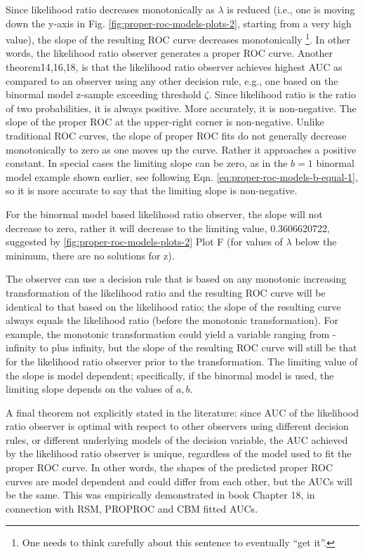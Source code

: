 \documentclass[
]{book}
\begin{document}
Since likelihood ratio decreases monotonically as \(\lambda\) is reduced (i.e., one is moving down the y-axis in Fig. \ref{fig:proper-roc-models-plots-2}, starting from a very high value), the slope of the resulting ROC curve decreases monotonically \footnote{One needs to think carefully about this sentence to eventually ``get it''.}. In other words, the likelihood ratio observer generates a proper ROC curve. Another theorem14,16,18, is that the likelihood ratio observer achieves highest AUC as compared to an observer using any other decision rule, e.g., one based on the binormal model z-sample exceeding threshold \(\zeta\). Since likelihood ratio is the ratio of two probabilities, it is always positive. More accurately, it is non-negative. The slope of the proper ROC at the upper-right corner is non-negative. Unlike traditional ROC curves, the slope of proper ROC fits do not generally decrease monotonically to zero as one moves up the curve. Rather it approaches a positive constant. In special cases the limiting slope can be zero, as in the \(b = 1\) binormal model example shown earlier, see following Eqn. \eqref{eq:proper-roc-models-b-equal-1}, so it is more accurate to say that the limiting slope is non-negative.

For the binormal model based likelihood ratio observer, the slope will not decrease to zero, rather it will decrease to the limiting value, 0.3606620722, suggested by \ref{fig:proper-roc-models-plots-2} Plot F (for values of \(\lambda\) below the minimum, there are no solutions for z).

The observer can use a decision rule that is based on any monotonic increasing transformation of the likelihood ratio and the resulting ROC curve will be identical to that based on the likelihood ratio; the slope of the resulting curve always equals the likelihood ratio (before the monotonic transformation). For example, the monotonic transformation could yield a variable ranging from -infinity to plus infinity, but the slope of the resulting ROC curve will still be that for the likelihood ratio observer prior to the transformation. The limiting value of the slope is model dependent; specifically, if the binormal model is used, the limiting slope depends on the values of \(a,b\).

A final theorem not explicitly stated in the literature: since AUC of the likelihood ratio observer is optimal with respect to other observers using different decision rules, or different underlying models of the decision variable, the AUC achieved by the likelihood ratio observer is unique, regardless of the model used to fit the proper ROC curve. In other words, the shapes of the predicted proper ROC curves are model dependent and could differ from each other, but the AUCs will be the same. This was empirically demonstrated in book Chapter 18, in connection with RSM, PROPROC and CBM fitted AUCs.
\end{document}
